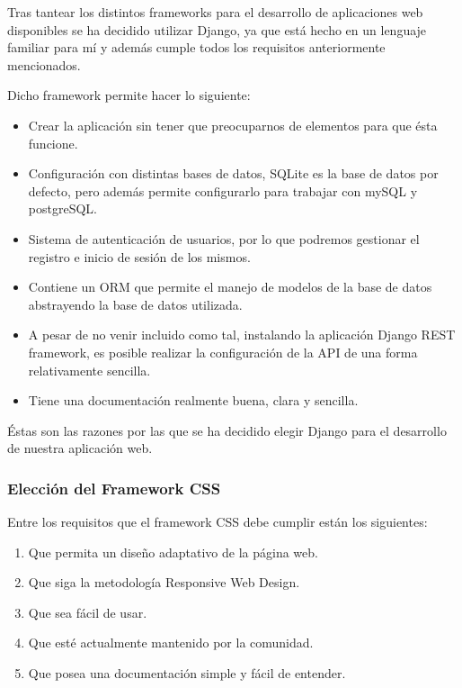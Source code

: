     Tras tantear los distintos frameworks para el desarrollo de aplicaciones web disponibles
    se ha decidido utilizar Django, ya que está hecho en un lenguaje familiar para mí y
    además cumple todos los requisitos anteriormente mencionados.

    Dicho framework permite hacer lo siguiente:
        
        \begin{itemize}
            \item Crear la aplicación sin tener que preocuparnos de elementos para que
            ésta funcione.
            \item Configuración con distintas bases de datos, SQLite es la base de datos
            por defecto, pero además permite configurarlo para trabajar con mySQL y
            postgreSQL.
            \item Sistema de autenticación de usuarios, por lo que podremos gestionar el
            registro e inicio de sesión de los mismos.
            \item Contiene un ORM que permite el manejo de modelos de la base de datos
            abstrayendo la base de datos utilizada.
            \item A pesar de no venir incluido como tal, instalando la aplicación Django
            REST framework, es posible realizar la configuración de la API de una forma
            relativamente sencilla.
            \item Tiene una documentación realmente buena, clara y sencilla.
        \end{itemize}
    
    Éstas son las razones por las que se ha decidido elegir Django para el desarrollo de
    nuestra aplicación web.

    \subsubsection{Elección del Framework CSS}
    Entre los requisitos que el framework CSS debe cumplir están los siguientes:

        \begin{enumerate}
            \item Que permita un diseño adaptativo de la página web.
            \item Que siga la metodología Responsive Web Design.
            \item Que sea fácil de usar.
            \item Que esté actualmente mantenido por la comunidad.
            \item Que posea una documentación simple y fácil de entender. 
        \end{enumerate}

